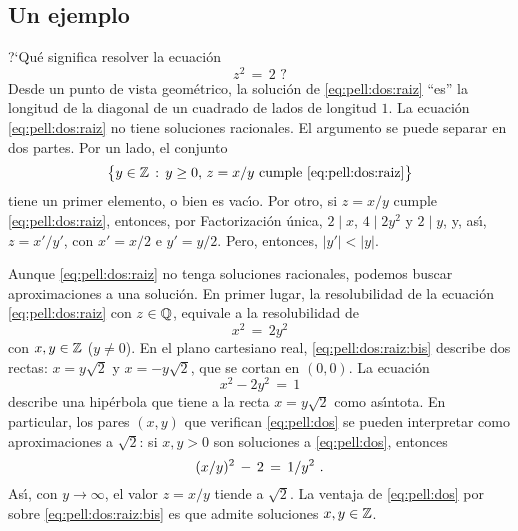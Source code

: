 \theoremstyle{plain}
\newtheorem{teoPell}{\teoname}[section]
\newtheorem{lemaPell}[teoPell]{\lemaname}

\theoremstyle{definition}
\newtheorem{obsPell}[teoPell]{\obsname}
\newtheorem{ejemPell}[teoPell]{\ejemname}


\subsection{Un ejemplo}\label{subsec:pell:dos}
?`Qu\'e significa resolver la ecuaci\'on
\begin{equation}
	\label{eq:pell:dos:raiz}
	z^2\,=\,2
	\text{ ?}
\end{equation}
%
Desde un punto de vista geom\'etrico, la soluci\'on de
\eqref{eq:pell:dos:raiz} ``es'' la longitud de la diagonal de un
cuadrado de lados de longitud $1$.
La ecuaci\'on \eqref{eq:pell:dos:raiz} no tiene soluciones racionales.
El argumento se puede separar en dos partes.
Por un lado, el conjunto
\begin{displaymath}
	\big\{y\in\mathbb{Z}\,:\,y\geq 0,\,
		z=x/y\text{ cumple }\eqref{eq:pell:dos:raiz} \big\}
\end{displaymath}
%
tiene un primer elemento, o bien es vac\'{\i}o.
Por otro, si $z=x/y$ cumple \eqref{eq:pell:dos:raiz}, entonces,
por Factorizaci\'on \'unica, $2\mid x$, $4\mid 2y^2$ y $2\mid y$,
y, as\'{\i}, $z=x'/y'$, con $x'=x/2$ e $y'=y/2$. Pero, entonces,
$|y'|<|y|$.

Aunque \eqref{eq:pell:dos:raiz} no tenga soluciones racionales,
podemos buscar aproximaciones a una soluci\'on.
En primer lugar, la resolubilidad de la ecuaci\'on \eqref{eq:pell:dos:raiz}
con $z\in\mathbb{Q}$, equivale a la resolubilidad de
\begin{equation}
	\label{eq:pell:dos:raiz:bis}
	x^2\,=\,2y^2
\end{equation}
%
con $x,y\in\mathbb{Z}$ ($y\neq 0$). En el plano cartesiano real,
\eqref{eq:pell:dos:raiz:bis} describe dos rectas:
$x=y\sqrt 2$ y $x=-y\sqrt 2$, que se cortan en $(0,0)$.
La ecuaci\'on
\begin{equation}
	\label{eq:pell:dos}
	x^2-2y^2\,=\,1
\end{equation}
%
describe una hip\'erbola que tiene a la recta $x=y\sqrt 2$ como
as\'{\i}ntota. En particular, los pares $(x,y)$ que verifican
\eqref{eq:pell:dos} se pueden interpretar como aproximaciones a
$\sqrt 2$: si $x,y>0$ son soluciones a \eqref{eq:pell:dos}, entonces
\begin{displaymath}
	(x/y)^2\,-\,2\,=\,1/y^2
	\text{ .}
\end{displaymath}
%
As\'{\i}, con $y\to\infty$, el valor $z=x/y$ tiende a $\sqrt 2$.
La ventaja de \eqref{eq:pell:dos} por sobre \eqref{eq:pell:dos:raiz:bis}
es que admite soluciones $x,y\in\mathbb{Z}$.

